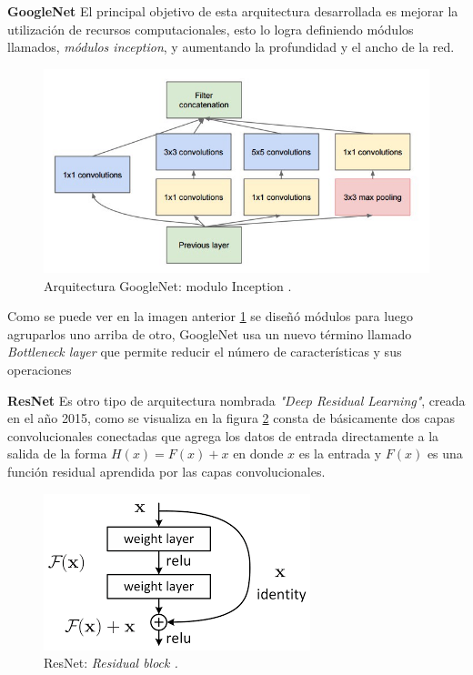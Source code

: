 \par \textbf{GoogleNet} \citep{googlenet} El principal objetivo de esta arquitectura desarrollada es mejorar la utilización de recursos computacionales, esto lo logra definiendo módulos llamados, \textit{módulos inception}, y aumentando la profundidad y el ancho de la red. 
\begin{figure}[H]
 \centering
  \includegraphics[scale=0.5,keepaspectratio=true,clip=true]{imagenes/MarcoTeorico/inception-1.jpg}
  \caption{Arquitectura GoogleNet: modulo Inception \citep{googlenet}.}
  	\label{Fig:inception}
\end{figure}
Como se puede ver en la imagen anterior \ref{Fig:inception} se diseñó módulos para luego agruparlos uno arriba de otro, GoogleNet usa un nuevo término llamado \textit{Bottleneck layer} que permite reducir el número de características y sus operaciones 

\par \textbf{ResNet} \citep{resnet_a} Es otro tipo de arquitectura nombrada \textit{"Deep Residual Learning"}, creada en el año 2015, como se visualiza en la figura \ref{Fig:resnet} consta de básicamente dos capas convolucionales conectadas que agrega los datos de entrada directamente a la salida de la forma $H(x) = F(x) + x$ en donde $x$ es la entrada y $F(x)$ es una función residual aprendida por las capas convolucionales.

\begin{figure}[H]
 \centering
  \includegraphics[scale=0.6,keepaspectratio=true,clip=true]{imagenes/MarcoTeorico/resnet.png}
  \caption{ResNet: \textit{Residual block \citep{resnet_a}.}}
	\label{Fig:resnet}
\end{figure}


